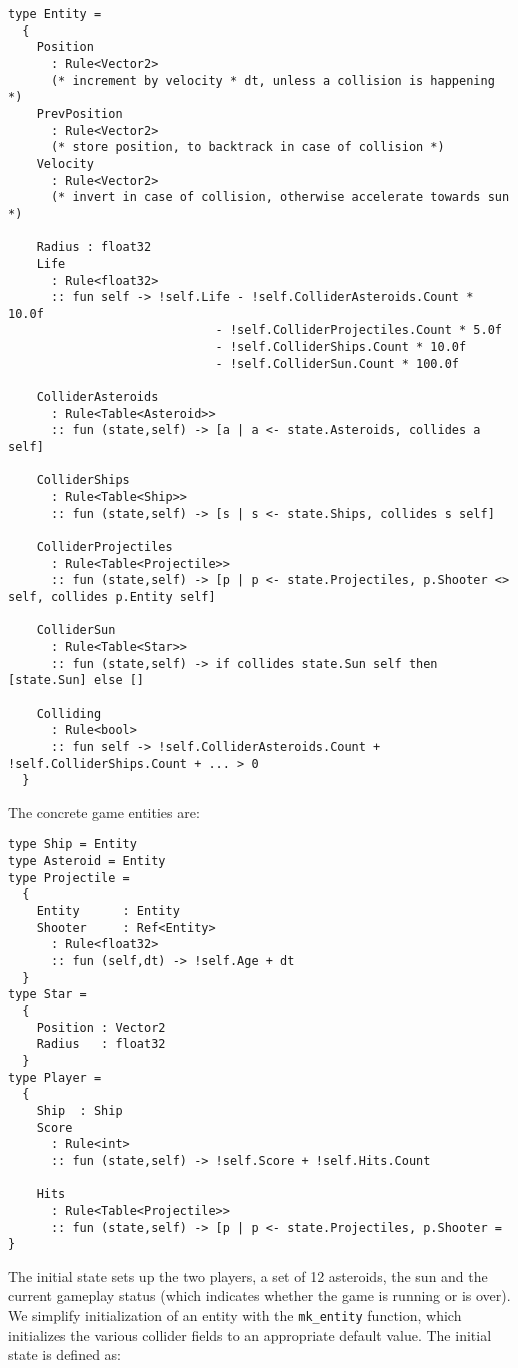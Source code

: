 \begin{lstlisting}
type Entity = 
  {
    Position
      : Rule<Vector2>
      (* increment by velocity * dt, unless a collision is happening *)
    PrevPosition
      : Rule<Vector2>
      (* store position, to backtrack in case of collision *)
    Velocity
      : Rule<Vector2>
      (* invert in case of collision, otherwise accelerate towards sun *)

    Radius : float32
    Life
      : Rule<float32>
      :: fun self -> !self.Life - !self.ColliderAsteroids.Count * 10.0f
                             - !self.ColliderProjectiles.Count * 5.0f
                             - !self.ColliderShips.Count * 10.0f
                             - !self.ColliderSun.Count * 100.0f

    ColliderAsteroids
      : Rule<Table<Asteroid>>
      :: fun (state,self) -> [a | a <- state.Asteroids, collides a self]

    ColliderShips
      : Rule<Table<Ship>>
      :: fun (state,self) -> [s | s <- state.Ships, collides s self]

    ColliderProjectiles
      : Rule<Table<Projectile>>
      :: fun (state,self) -> [p | p <- state.Projectiles, p.Shooter <> self, collides p.Entity self]

    ColliderSun
      : Rule<Table<Star>>
      :: fun (state,self) -> if collides state.Sun self then [state.Sun] else []

    Colliding
      : Rule<bool>
      :: fun self -> !self.ColliderAsteroids.Count + !self.ColliderShips.Count + ... > 0
  }
\end{lstlisting}

The concrete game entities are:

\begin{lstlisting}
type Ship = Entity
type Asteroid = Entity
type Projectile = 
  {
    Entity      : Entity
    Shooter     : Ref<Entity>
      : Rule<float32>
      :: fun (self,dt) -> !self.Age + dt
  }
type Star =
  {
    Position : Vector2
    Radius   : float32
  }
type Player = 
  {
    Ship  : Ship    
    Score 
      : Rule<int>
      :: fun (state,self) -> !self.Score + !self.Hits.Count

    Hits
      : Rule<Table<Projectile>>
      :: fun (state,self) -> [p | p <- state.Projectiles, p.Shooter =   }
\end{lstlisting}

The initial state sets up the two players, a set of 12 asteroids, the sun and the current gameplay status (which indicates whether the game is running or is over). We simplify initialization of an entity with the \texttt{mk\_entity} function, which initializes the various collider fields to an appropriate default value. The initial state is defined as:

